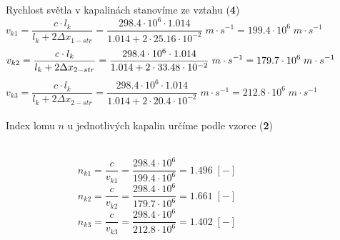 \documentclass{article}
\begin{document}
\begin{figure}[H]
	\begin{minipage}[t]{\textwidth}
        Rychlost světla v kapalinách stanovíme ze vztahu (\textbf{4})\\
        \begin{displaymath}
            v_{k1}=\frac{c\cdot l_k}{l_k+2\Delta x_{1-str}}=\frac{298.4\cdot10^{6}\cdot 1.014}{1.014+2\cdot25.16\cdot10^{-2}}\;m\cdot s^{-1}=199.4\cdot10^{6}\;m\cdot s^{-1}
        \end{displaymath}
        \begin{displaymath}
            v_{k2}=\frac{c\cdot l_k}{l_k+2\Delta x_{2-str}}=\frac{298.4\cdot10^{6}\cdot 1.014}{1.014+2\cdot33.48\cdot10^{-2}}\;m\cdot s^{-1}=179.7\cdot10^{6}\;m\cdot s^{-1}\\
        \end{displaymath}
        \begin{displaymath}
            v_{k3}=\frac{c\cdot l_k}{l_k+2\Delta x_{2-str}}=\frac{298.4\cdot10^{6}\cdot 1.014}{1.014+2\cdot20.4\cdot10^{-2}}\;m\cdot s^{-1}=212.8\cdot10^{6}\;m\cdot s^{-1}
        \end{displaymath}
        \\
        Index lomu \(n\) u jednotlivých kapalin určíme podle vzorce (\textbf{2}) \\
        \\
\vspace{-7mm}

        \begin{displaymath}
            n_{k1}=\frac{c}{v_{k1}}=\frac{298.4\cdot10^{6}}{199.4\cdot10^{6}}=1.496\;[-]
        \end{displaymath}
        \begin{displaymath}
            n_{k2}=\frac{c}{v_{k2}}=\frac{298.4\cdot10^{6}}{179.7\cdot10^{6}}=1.661\;[-]
        \end{displaymath}
        \begin{displaymath}
            n_{k3}=\frac{c}{v_{k3}}=\frac{298.4\cdot10^{6}}{212.8\cdot10^{6}}=1.402\;[-]
        \end{displaymath}
    \end{minipage}
\end{figure}
\vspace{-11mm}
\end{document}
